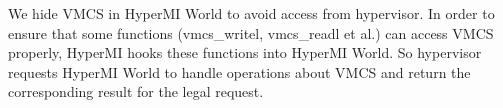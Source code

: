 \documentclass[conference]{IEEEtran}
\begin{document}
%


We hide VMCS in HyperMI World to avoid access from hypervisor. 
In order to ensure that some functions (vmcs\_writel, vmcs\_readl et al.) can access VMCS properly, HyperMI hooks these functions into HyperMI World. So hypervisor requests HyperMI World to handle operations about VMCS and return the corresponding result for the legal request. 
\end{document}

